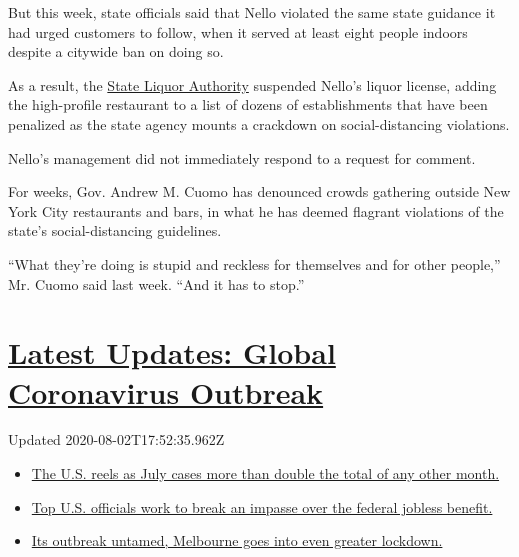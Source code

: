 But this week, state officials said that Nello violated the same state
guidance it had urged customers to follow, when it served at least eight
people indoors despite a citywide ban on doing so.

As a result, the \href{https://sla.ny.gov/}{State Liquor Authority}
suspended Nello's liquor license, adding the high-profile restaurant to
a list of dozens of establishments that have been penalized as the state
agency mounts a crackdown on social-distancing violations.

Nello's management did not immediately respond to a request for comment.

For weeks, Gov. Andrew M. Cuomo has denounced crowds gathering outside
New York City restaurants and bars, in what he has deemed flagrant
violations of the state's social-distancing guidelines.

``What they're doing is stupid and reckless for themselves and for other
people,'' Mr. Cuomo said last week. ``And it has to stop.''

\hypertarget{latest-updates-global-coronavirus-outbreak}{%
\section{\texorpdfstring{\href{https://www.nytimes.com/2020/08/01/world/coronavirus-covid-19.html?action=click\&pgtype=Article\&state=default\&region=MAIN_CONTENT_1\&context=storylines_live_updates}{Latest
Updates: Global Coronavirus
Outbreak}}{Latest Updates: Global Coronavirus Outbreak}}\label{latest-updates-global-coronavirus-outbreak}}

Updated 2020-08-02T17:52:35.962Z

\begin{itemize}
\tightlist
\item
  \href{https://www.nytimes.com/2020/08/01/world/coronavirus-covid-19.html?action=click\&pgtype=Article\&state=default\&region=MAIN_CONTENT_1\&context=storylines_live_updates\#link-34047410}{The
  U.S. reels as July cases more than double the total of any other
  month.}
\item
  \href{https://www.nytimes.com/2020/08/01/world/coronavirus-covid-19.html?action=click\&pgtype=Article\&state=default\&region=MAIN_CONTENT_1\&context=storylines_live_updates\#link-780ec966}{Top
  U.S. officials work to break an impasse over the federal jobless
  benefit.}
\item
  \href{https://www.nytimes.com/2020/08/01/world/coronavirus-covid-19.html?action=click\&pgtype=Article\&state=default\&region=MAIN_CONTENT_1\&context=storylines_live_updates\#link-2bc8948}{Its
  outbreak untamed, Melbourne goes into even greater lockdown.}
\end{itemize}

